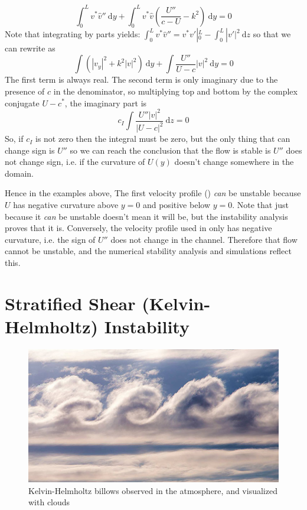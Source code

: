 \documentclass[11pt]{article}
\begin{document}
\begin{equation}
    \int_{0}^L v^{*}\hat{v}'' \ \mathrm{d}y +  \int_{0}^L v^{*}\hat{v}\left(\frac{U''}{c-U} - k^2 \right) \ \mathrm{d}y  = 0
\end{equation} 
Note that integrating by parts yields: $\int_{0}^L v^{*}\hat{v}''  = v^{*}v'|^{L}_0 - \int_{0}^L |v'|^2\ \mathrm{d}z$ so that we can rewrite as 
\begin{equation}
    \int \left(|v_y|^2  + k^2|v|^2 \right)\ \mathrm{d}y + \int \frac{U''}{U-c} |v|^2 \ \mathrm{d}y = 0
\end{equation}
The first term is always real.  The second term is only imaginary due to the presence of $c$ in the denominator, so multiplying top and bottom by the complex conjugate $U-c^*$, the imaginary part is
\begin{equation}
    c_{I}\int \frac{U'' |v|^2}{|U-c|^2}\ \mathrm{d}z = 0
\end{equation}
So, if $c_I$ is not zero then the integral must be zero, but the only thing that can change sign is $U''$ so we can reach the conclusion that the flow is stable is $U''$ does not change sign, i.e. if the curvature of $U(y)$ doesn't change somewhere in the domain.  


Hence in the examples above, The first velocity profile () \emph{can} be unstable because $U$ has negative curvature above $y=0$ and positive below $y=0$.  Note that just because it \emph{can} be unstable doesn't mean it will be, but the instability analysis proves that it is.  Conversely, the velocity profile used in  only has negative curvature, i.e. the sign of $U''$ does not change in the channel.  Therefore that flow cannot be unstable, and the numerical stability analysis and simulations reflect this.  


\section{Stratified Shear (Kelvin-Helmholtz) Instability}

\begin{figure}
\begin{center}
  \includegraphics[width=4.5in]{images/KHBillows}  
\end{center}
\caption{Kelvin-Helmholtz billows observed in the atmosphere, and visualized with clouds}
\end{figure}
\end{document}
